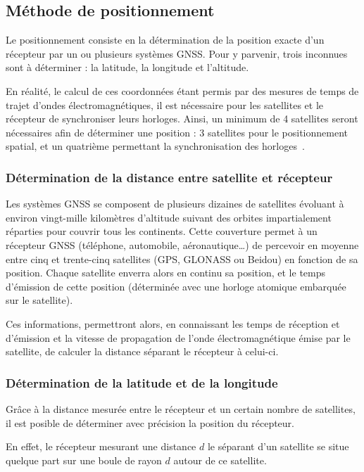    \subsection{Méthode de positionnement}\label{subsec:methode-de-positionnement}
      Le positionnement consiste en la détermination de la position exacte d'un récepteur par un ou plusieurs systèmes GNSS\@.
      Pour y parvenir, trois inconnues sont à déterminer : la latitude, la longitude et l'altitude.

      En réalité, le calcul de ces coordonnées étant permis par des mesures de temps de trajet d'ondes électromagnétiques, il est nécessaire pour les satellites et le récepteur de synchroniser leurs horloges.
      Ainsi, un minimum de 4 satellites seront nécessaires afin de déterminer une position : 3 satellites pour le positionnement spatial, et un quatrième permettant la synchronisation des horloges~\cite{bosserGNSSSystemesGlobaux2017}.

      \subsubsection{Détermination de la distance entre satellite et récepteur}
         Les systèmes GNSS se composent de plusieurs dizaines de satellites évoluant à environ vingt-mille kilomètres d'altitude suivant des orbites impartialement réparties pour couvrir tous les continents.
         Cette couverture permet à un récepteur GNSS (téléphone, automobile, aéronautique\dots) de percevoir en moyenne entre cinq et trente-cinq satellites (GPS, GLONASS ou Beidou) en fonction de sa position.
         Chaque satellite enverra alors en continu sa position, et le temps d'émission de cette position (déterminée avec une horloge atomique embarquée sur le satellite).

         Ces informations, permettront alors, en connaissant les temps de réception et d'émission et la vitesse de propagation de l'onde électromagnétique émise par le satellite, de calculer la distance séparant le récepteur à celui-ci.

      \subsubsection{Détermination de la latitude et de la longitude}
         Grâce à la distance mesurée entre le récepteur et un certain nombre de satellites, il est posible de déterminer avec précision la position du récepteur.

         En effet, le récepteur mesurant une distance $d$ le séparant d'un satellite se situe quelque part sur une boule de rayon $d$ autour de ce satellite.

